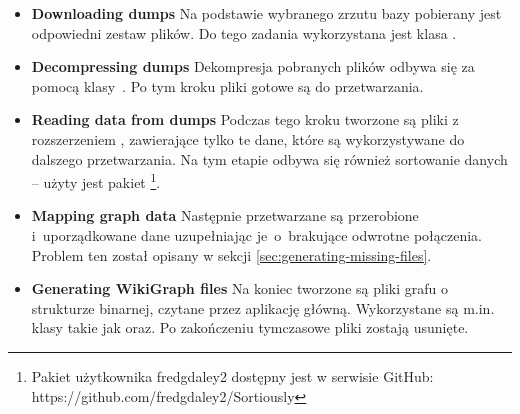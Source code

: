 \begin{itemize}
    \item \textbf{Downloading dumps} Na podstawie wybranego zrzutu bazy pobierany jest odpowiedni zestaw plików. Do tego zadania wykorzystana jest klasa .
    \item \textbf{Decompressing dumps} Dekompresja pobranych plików odbywa się za pomocą klasy~. Po tym kroku pliki  gotowe są do przetwarzania.
    \item \textbf{Reading data from dumps} Podczas tego kroku tworzone są pliki z rozszerzeniem , zawierające tylko te dane, które są wykorzystywane do dalszego przetwarzania. Na tym etapie odbywa się również sortowanie danych – użyty jest pakiet \footnote{Pakiet użytkownika fredgdaley2 dostępny jest w serwisie GitHub: https://github.com/fredgdaley2/Sortiously}.
    \item \textbf{Mapping graph data} Następnie przetwarzane są przerobione i~uporządkowane dane uzupełniając je~o~brakujące odwrotne połączenia. Problem ten został opisany w sekcji \ref{sec:generating-missing-files}.
    \item \textbf{Generating WikiGraph files} Na koniec tworzone są pliki grafu o strukturze binarnej, czytane przez aplikację główną. Wykorzystane są m.in. klasy takie jak  oraz\linebreak {}. Po zakończeniu tymczasowe pliki zostają usunięte.
\end{itemize}